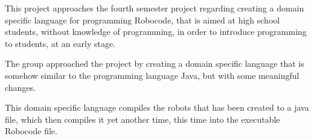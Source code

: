 This project approaches the fourth semester project regarding creating a domain specific language for programming Robocode, that is aimed at high school students, without knowledge of programming, in order to introduce programming to students, at an early stage. \newline

The group approached the project by creating a domain specific language that is somehow similar to the programming language Java, but with some meaningful changes. \newline

This domain specific language compiles the robots that has been created to a java file, which then compiles it yet another time, this time into the executable Robocode file. 
